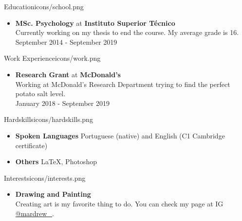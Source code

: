 \documentclass{thepurplecv}
\begin{document}
\begin{purplesectionleft}{Education}{icons/school.png}
{
\begin{itemize}[leftmargin=0cm,align=left]
    \item[] \textbf{MSc. Psychology} at \textbf{Instituto Superior Técnico}\\
    Currently working on my thesis to end the course. My average grade is 16. \\
    September 2014 - September 2019
\end{itemize}
}
\end{purplesectionleft}

\begin{purplesectionright}{Work Experience}{icons/work.png}
{
\begin{itemize}[leftmargin=0cm,align=left]
    \item[] \textbf{Research Grant} at \textbf{McDonald's}\\
    Working at McDonald's Research Department trying to find the perfect potato salt level.\\
    January 2018 - September 2019
\end{itemize}
}
\end{purplesectionright}

\begin{purplesectionleft}{Hardskills}{icons/hardskills.png}
{
\begin{itemize}[leftmargin=0cm,align=left]
    \item[] \textbf{Spoken Languages}
    Portuguese (native) and English (C1 Cambridge certificate)
    \\
    \item[] \textbf{Others}
    \LaTeX, Photoshop
\end{itemize}
}
\end{purplesectionleft}

\begin{purplesectionright}{Interests}{icons/interests.png}
{
\begin{itemize}[leftmargin=0cm,align=left]
    \item[] \textbf{Drawing and Painting}\\
    Creating art is my favorite thing to do. You can check my page at IG  \href{https://www.instagram.com/mardrew_/}{@mardrew\_}.\\
\end{itemize}
}
\end{purplesectionright}
\end{document}
